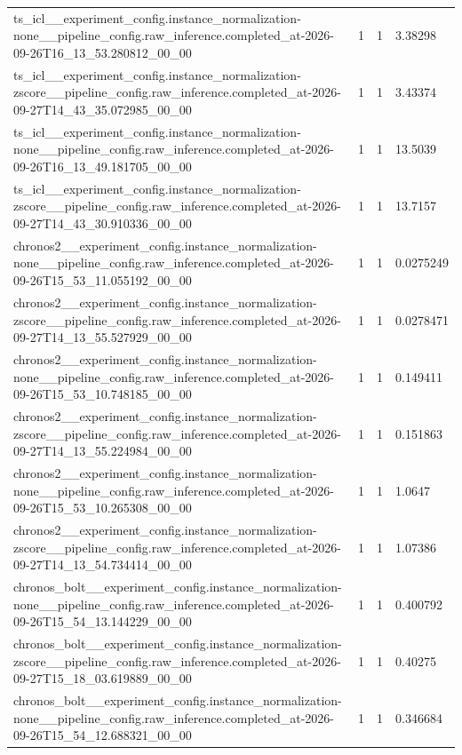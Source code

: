 \begin{tabular}{llll}
ts\_icl\_\_experiment\_config.instance\_normalization-none\_\_pipeline\_config.raw\_inference.completed\_at-2026-09-26T16\_13\_53.280812\_00\_00 & 1 & 1 & 3.38298 \\
ts\_icl\_\_experiment\_config.instance\_normalization-zscore\_\_pipeline\_config.raw\_inference.completed\_at-2026-09-27T14\_43\_35.072985\_00\_00 & 1 & 1 & 3.43374 \\
ts\_icl\_\_experiment\_config.instance\_normalization-none\_\_pipeline\_config.raw\_inference.completed\_at-2026-09-26T16\_13\_49.181705\_00\_00 & 1 & 1 & 13.5039 \\
ts\_icl\_\_experiment\_config.instance\_normalization-zscore\_\_pipeline\_config.raw\_inference.completed\_at-2026-09-27T14\_43\_30.910336\_00\_00 & 1 & 1 & 13.7157 \\
chronos2\_\_experiment\_config.instance\_normalization-none\_\_pipeline\_config.raw\_inference.completed\_at-2026-09-26T15\_53\_11.055192\_00\_00 & 1 & 1 & 0.0275249 \\
chronos2\_\_experiment\_config.instance\_normalization-zscore\_\_pipeline\_config.raw\_inference.completed\_at-2026-09-27T14\_13\_55.527929\_00\_00 & 1 & 1 & 0.0278471 \\
chronos2\_\_experiment\_config.instance\_normalization-none\_\_pipeline\_config.raw\_inference.completed\_at-2026-09-26T15\_53\_10.748185\_00\_00 & 1 & 1 & 0.149411 \\
chronos2\_\_experiment\_config.instance\_normalization-zscore\_\_pipeline\_config.raw\_inference.completed\_at-2026-09-27T14\_13\_55.224984\_00\_00 & 1 & 1 & 0.151863 \\
chronos2\_\_experiment\_config.instance\_normalization-none\_\_pipeline\_config.raw\_inference.completed\_at-2026-09-26T15\_53\_10.265308\_00\_00 & 1 & 1 & 1.0647 \\
chronos2\_\_experiment\_config.instance\_normalization-zscore\_\_pipeline\_config.raw\_inference.completed\_at-2026-09-27T14\_13\_54.734414\_00\_00 & 1 & 1 & 1.07386 \\
chronos\_bolt\_\_experiment\_config.instance\_normalization-none\_\_pipeline\_config.raw\_inference.completed\_at-2026-09-26T15\_54\_13.144229\_00\_00 & 1 & 1 & 0.400792 \\
chronos\_bolt\_\_experiment\_config.instance\_normalization-zscore\_\_pipeline\_config.raw\_inference.completed\_at-2026-09-27T15\_18\_03.619889\_00\_00 & 1 & 1 & 0.40275 \\
chronos\_bolt\_\_experiment\_config.instance\_normalization-none\_\_pipeline\_config.raw\_inference.completed\_at-2026-09-26T15\_54\_12.688321\_00\_00 & 1 & 1 & 0.346684 \\

\end{tabular}
